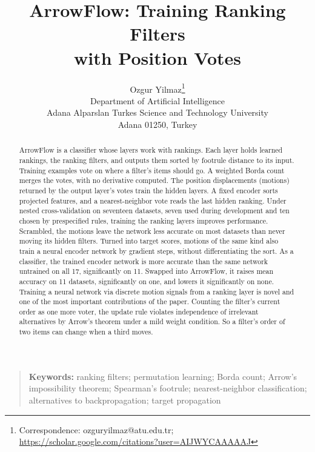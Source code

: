 \documentclass[12pt]{article}
\begin{document}
\title{ArrowFlow: Training Ranking Filters\\with Position Votes}
\author{Ozgur Yilmaz\footnote{Correspondence: ozguryilmaz@atu.edu.tr; \url{https://scholar.google.com/citations?user=AIJWYCAAAAAJ}} \\
\small Department of Artificial Intelligence\\
\small Adana Alparslan Turkes Science and Technology University\\
\small Adana 01250, Turkey}
\date{}
\maketitle

\begin{abstract}
ArrowFlow is a classifier whose layers work with rankings. Each layer holds learned rankings, the ranking filters, and outputs them sorted by footrule distance to its input. Training examples vote on where a filter's items should go. A weighted Borda count merges the votes, with no derivative computed. The position displacements (motions) returned by the output layer's votes train the hidden layers. A fixed encoder sorts projected features, and a nearest-neighbor vote reads the last hidden ranking. Under nested cross-validation on seventeen datasets, seven used during development and ten chosen by prespecified rules, training the ranking layers improves performance. Scrambled, the motions leave the network less accurate on most datasets than never moving its hidden filters. Turned into target scores, motions of the same kind also train a neural encoder network by gradient steps, without differentiating the sort. As a classifier, the trained encoder network is more accurate than the same network untrained on all 17, significantly on 11. Swapped into ArrowFlow, it raises mean accuracy on 11 datasets, significantly on one, and lowers it significantly on none. Training a neural network via discrete motion signals from a ranking layer is novel and one of the most important contributions of the paper. Counting the filter's current order as one more voter, the update rule violates independence of irrelevant alternatives by Arrow's theorem under a mild weight condition. So a filter's order of two items can change when a third moves.
\end{abstract}
\begin{quote}\small\noindent\textbf{Keywords:} ranking filters; permutation learning; Borda count; Arrow's impossibility theorem; Spearman's footrule; nearest-neighbor classification; alternatives to backpropagation; target propagation\end{quote}
\end{document}
